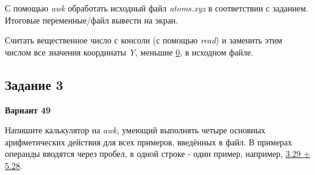 \documentclass[12pt, a4paper]{report}
\begin{document}
	\par
	С помощью \textit{awk} обработать исходный файл \textit{atoms.xyz} в соответствии с заданием. Итоговые переменные/файл вывести на экран.
	\par
	Считать вещественное число с консоли (с помощью \textit{read}) и заменить этим числом все значения координаты \textit{Y}, меньшие \underline{0}, в исходном файле.
	\lstset{style=mystyle}
	
	

	\subsection*{Задание 3}
	\large
	\begin{center}
		\textbf{Вариант 49}
	\end{center}
	Напишите калькулятор на \textit{awk}, умеющий выполнять четыре основных арифметических действия для всех примеров, введённых в файл. В примерах операнды вводятся через пробел, в одной строке - один пример, например, \underline{3.29 + 5.28}.
	\par
	\lstset{style=mystyle}
	
	
	
\end{document}
